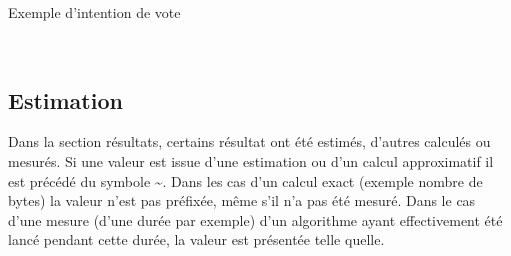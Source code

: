 \documentclass[../report]{subfiles}
\begin{document}
  \begin{table}[h]
  	\begin{center}
  		\caption{Exemple d'intention de vote}%
  		\label{fig:intro:notation:note-A}
  		\\[1em]
  	\end{center}
  \end{table}
  
  
  
  \subsection{Estimation}\label{sec:intro:notation:estimation}
  
  Dans la section résultats, certains résultat ont été estimés, d'autres calculés ou mesurés.
  Si une valeur est issue d'une estimation ou d'un calcul approximatif il est précédé du symbole \textasciitilde.
  Dans les cas d'un calcul exact (exemple nombre de bytes) la valeur n'est pas préfixée, même s'il n'a pas été mesuré.
  Dans le cas d'une mesure (d'une durée par exemple) d'un algorithme ayant effectivement été lancé pendant cette durée, la valeur est présentée telle quelle.
\end{document}
